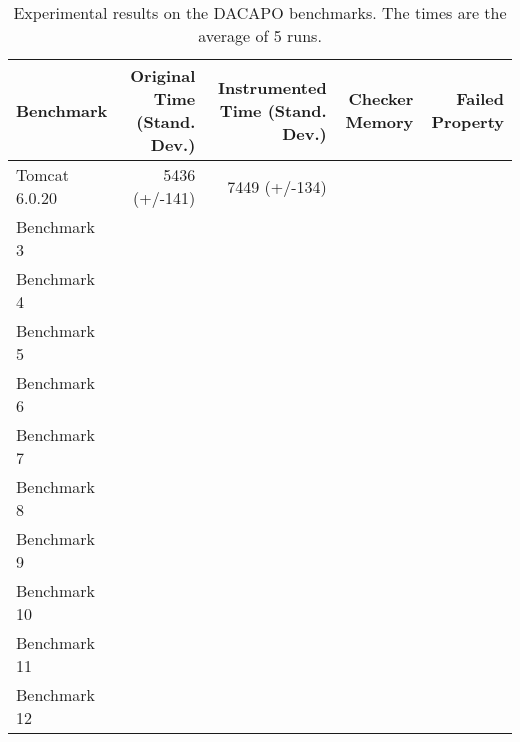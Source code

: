 \documentclass{sigplanconf}[10pt] %
\begin{document}
\begin{table*}[t]
      \centering
   \begin{tabular}{| l | r | r | r | r | }
   \hline 
  Benchmark  & Original Time (Stand. Dev.) & Instrumented Time (Stand. Dev.) & Checker Memory & Failed Property
\\ \hline \hline
Tomcat 6.0.20 &  5436 (+/-141) & 7449 (+/-134) & &
\\ \hline
Benchmark 3 & & &  &
\\ \hline 
Benchmark 4 & & &  &
\\ \hline 
Benchmark 5 & & &  &
\\ \hline 
Benchmark 6 & & &  &
\\ \hline
Benchmark 7 & & &  &
\\ \hline 
Benchmark 8 & & &  &
\\ \hline 
Benchmark 9 & & &  &
\\ \hline 
Benchmark 10 & & &  &
\\ \hline 
Benchmark 11 & & &  &
\\ \hline 
Benchmark 12 & & &  &
\\ \hline 
\end{tabular}
    \caption{Experimental results on the DACAPO benchmarks. The times are the average of 5 runs.}
   \label{tab:booktabs}
\end{table*}
\end{document}
